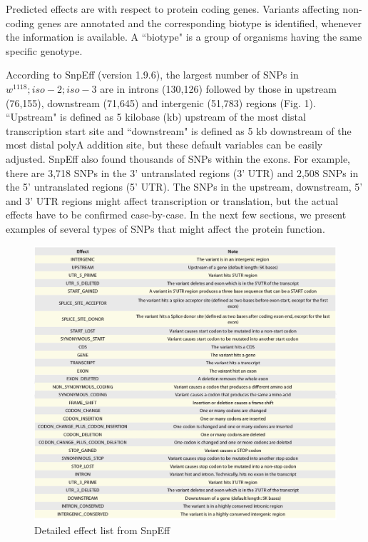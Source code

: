 Predicted effects are with respect to protein coding genes.  Variants affecting non-coding genes are annotated and the corresponding biotype is identified, whenever the information is available. A ``biotype" is a group of organisms having the same specific genotype.

According to SnpEff (version 1.9.6), the largest number of SNPs in $w^{1118} ; iso-2; iso-3$ are in introns (130,126) followed by those in upstream (76,155), downstream (71,645) and intergenic (51,783) regions (Fig. 1). ``Upstream" is defined as 5 kilobase (kb) upstream of the most distal transcription start site and ``downstream" is defined as 5 kb downstream of the most distal polyA addition site, but these default variables can be easily adjusted.  SnpEff also found thousands of SNPs within the exons. For example, there are 3,718 SNPs in the 3' untranslated regions (3' UTR) and 2,508 SNPs in the 5' untranslated regions (5' UTR).  The SNPs in the upstream, downstream, 5' and 3' UTR regions might affect transcription or translation, but the actual effects have to be confirmed case-by-case. In the next few sections, we present examples of several types of SNPs that might affect the protein function.

\begin{figure}
    \centering
    \includegraphics[width=14cm]{snpeff_table2.png}
    \caption{Detailed effect list from SnpEff}
    \label{fig:snpeffTab2}
\end{figure}

